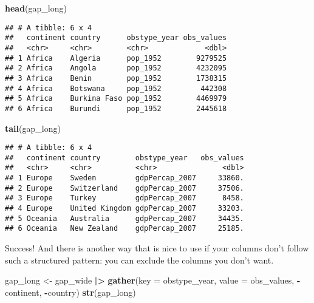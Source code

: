 \documentclass[
]{article}
\newenvironment{Shaded}{\begin{snugshade}}{\end{snugshade}}
\newcommand{\AttributeTok}[1]{\textcolor[rgb]{0.13,0.29,0.53}{#1}}
\newcommand{\FunctionTok}[1]{\textcolor[rgb]{0.13,0.29,0.53}{\textbf{#1}}}
\newcommand{\NormalTok}[1]{#1}
\newcommand{\OtherTok}[1]{\textcolor[rgb]{0.56,0.35,0.01}{#1}}
\newcommand{\SpecialCharTok}[1]{\textcolor[rgb]{0.81,0.36,0.00}{\textbf{#1}}}
\begin{document}
\begin{Shaded}
\begin{Highlighting}[]
\FunctionTok{head}\NormalTok{(gap\_long)}
\end{Highlighting}
\end{Shaded}

\begin{verbatim}
## # A tibble: 6 x 4
##   continent country      obstype_year obs_values
##   <chr>     <chr>        <chr>             <dbl>
## 1 Africa    Algeria      pop_1952        9279525
## 2 Africa    Angola       pop_1952        4232095
## 3 Africa    Benin        pop_1952        1738315
## 4 Africa    Botswana     pop_1952         442308
## 5 Africa    Burkina Faso pop_1952        4469979
## 6 Africa    Burundi      pop_1952        2445618
\end{verbatim}

\begin{Shaded}
\begin{Highlighting}[]
\FunctionTok{tail}\NormalTok{(gap\_long)}
\end{Highlighting}
\end{Shaded}

\begin{verbatim}
## # A tibble: 6 x 4
##   continent country        obstype_year   obs_values
##   <chr>     <chr>          <chr>               <dbl>
## 1 Europe    Sweden         gdpPercap_2007     33860.
## 2 Europe    Switzerland    gdpPercap_2007     37506.
## 3 Europe    Turkey         gdpPercap_2007      8458.
## 4 Europe    United Kingdom gdpPercap_2007     33203.
## 5 Oceania   Australia      gdpPercap_2007     34435.
## 6 Oceania   New Zealand    gdpPercap_2007     25185.
\end{verbatim}

Success! And there is another way that is nice to use if your columns
don't follow such a structured pattern: you can exclude the columns you
don't want.

\begin{Shaded}
\begin{Highlighting}[]
\NormalTok{gap\_long }\OtherTok{\textless{}{-}}\NormalTok{ gap\_wide }\SpecialCharTok{|\textgreater{}}
  \FunctionTok{gather}\NormalTok{(}\AttributeTok{key =}\NormalTok{ obstype\_year,}
         \AttributeTok{value =}\NormalTok{ obs\_values,}
         \SpecialCharTok{{-}}\NormalTok{continent, }\SpecialCharTok{{-}}\NormalTok{country)}
\FunctionTok{str}\NormalTok{(gap\_long)}
\end{Highlighting}
\end{Shaded}
\end{document}
